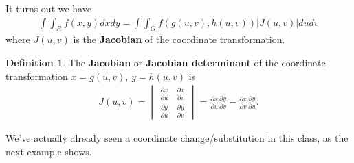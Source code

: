 \documentclass[12pt, letter]{article}
\theoremstyle{plain}
\numberwithin{theorem}{section}
\theoremstyle{definition}
\newtheorem{definition}[theorem]{Definition}
\begin{document}
\bigskip

It turns out we have
\begin{align*}
\int\int_R f(x,y)dxdy = \int\int_G f(g(u,v),h(u,v))|J(u,v)|dudv
\end{align*}
where $J(u,v)$ is the \textbf{Jacobian} of the coordinate transformation.

\bigskip

\hrulefill

\bigskip

\begin{definition}
The \textbf{Jacobian} or \textbf{Jacobian determinant} of the coordinate transformation $x=g(u,v)$, $y=h(u,v)$ is
\begin{align*}
J(u,v) = \begin{vmatrix} \frac{\partial x}{\partial u} & \frac{\partial x}{\partial v} \\ \frac{\partial y}{\partial u} & \frac{\partial y}{\partial v} \end{vmatrix} = \frac{\partial x}{\partial u}\frac{\partial y}{\partial v}-\frac{\partial x}{\partial v}\frac{\partial y}{\partial u}.
\end{align*}
\end{definition}

\bigskip

\hrulefill

\bigskip

We've actually already seen a coordinate change/substitution in this class, as the next example shows.
\end{document}
